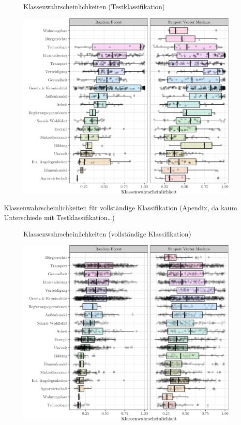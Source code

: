 \documentclass[]{article}
\begin{document}
\begin{figure}[!h]
    \caption{Klassenwahrscheinlichkeiten (Testklassifikation)}
    \label{probs_real}
    \centering
    \includegraphics[width=\textwidth]{images/rf_svm_prob_boxplot_2.png}
    \caption*{\scriptsize }
\end{figure}

Klassenwahrscheinlichkeiten für vollständige Klassifikation (Apendix, da
kaum Unterschiede mit Testklassifikation\ldots{})

\begin{figure}[!h]
    \caption{Klassenwahrscheinlichkeiten (vollständige Klassifikation)}
    \label{probs_real}
    \centering
    \includegraphics[width=\textwidth]{images/prob_boxplot_real_mod_2.png}
    \caption*{\scriptsize }
\end{figure}
\end{document}
